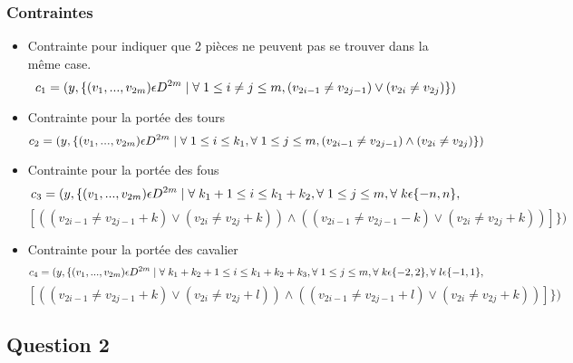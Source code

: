 \documentclass[a4paper,11pt]{article}
\begin{document}
\subsubsection{Contraintes}
\begin{itemize}
\item Contrainte pour indiquer que 2 pièces ne peuvent pas se trouver dans la même case.
   $$c_{1} = ( y, \{ (v_{1}, ..., v_{2m}) \epsilon  D^{2m} \mid \forall \hspace{0.1cm}  1\leq i \neq j \leq m, (v_{2i-1} \neq v_{2j-1}) \vee  (v_{2i} \neq v_{2j}) \} ) $$
\item Contrainte pour la portée des tours 
 $$ c_{2} = ( y, \{ (v_{1}, ..., v_{2m}) \epsilon  D^{2m} \mid \forall \hspace{0.1cm} 1\leq i \leq k_{1}, \forall \hspace{0.1cm} 1\leq j \leq m, (v_{2i-1} \neq v_{2j-1}) \wedge  (v_{2i} \neq v_{2j}) \} ) $$

\item Contrainte pour la portée des fous 
  $$c_{3} = ( y, \{ (v_{1}, ..., v_{2m}) \epsilon  D^{2m} \mid \forall \hspace{0.1cm}  k_{1}+1\leq i \leq k_{1}+k_{2}, \forall \hspace{0.1cm} 1\leq j \leq m, \forall \hspace{0.1cm} k \epsilon \{-n, n \}, $$
  $$[ ((v_{2i-1} \neq v_{2j-1}+k) \vee  (v_{2i} \neq v_{2j}+k)) \wedge  ((v_{2i-1} \neq v_{2j-1}-k) \vee  (v_{2i} \neq v_{2j}+k)) ] \})$$

\item Contrainte pour la portée des cavalier 
  $$ c_{4} = ( y, \{ (v_{1}, ..., v_{2m}) \epsilon  D^{2m} \mid \forall \hspace{0.1cm} k_{1}+k_{2}+1\leq i \leq k_{1}+k_{2}+k_{3}, \forall \hspace{0.1cm} 1\leq j \leq m, \forall \hspace{0.1cm} k \epsilon \{-2, 2\}, \forall \hspace{0.1cm}l \epsilon \{-1, 1\}, $$
  $$[((v_{2i-1} \neq v_{2j-1}+k) \vee  (v_{2i} \neq v_{2j}+l)) \wedge ((v_{2i-1} \neq v_{2j-1}+l) \vee  (v_{2i} \neq v_{2j}+k)) ] \})$$

\end{itemize}

\newpage 
\subsection{Question 2}
\end{document}

